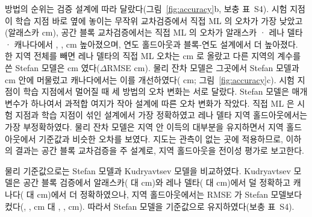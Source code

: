 방법의 순위는 검증 설계에 따라 달랐다(그림~\ref{fig:accuracy}b, 보충 표~S4). 시험 지점이 학습 지점 바로 옆에 놓이는 무작위 교차검증에서 직접 ML 의 오차가 가장 낮았고(알래스카 \nrmseAkrandDz{} cm), 공간 블록 교차검증에서는 직접 ML 의 오차가 알래스카 · 레나 델타 · 캐나다에서 \noptimAkDz, \noptimLeDz, \noptimCaDz{} cm 높아졌으며, 연도 홀드아웃과 블록-연도 설계에서 더 높아졌다. 한 지역 전체를 빼면 레나 델타의 직접 ML 오차는 \nrmseLeregDz{} cm 로 올랐고 다른 지역의 계수를 쓴 Stefan 모델은 \nrmseLeregPz{} cm 였다($\Delta$RMSE \ndrefLeregDz{} cm). 물리 잔차 모델은 그곳에서 Stefan 모델과 \ndrefLeregRoabs{} cm 안에 머물렀고 캐나다에서는 이를 개선하였다(\ndrefCaregRo{} cm; 그림~\ref{fig:accuracy}c). 시험 지점이 학습 지점에서 멀어질 때 세 방법의 오차 변화는 서로 달랐다. Stefan 모델은 매개변수가 하나여서 과적합 여지가 작아 설계에 따른 오차 변화가 작았다. 직접 ML 은 시험 지점과 학습 지점이 섞인 설계에서 가장 정확하였고 레나 델타 지역 홀드아웃에서는 가장 부정확하였다. 물리 잔차 모델은 지역 안 이득의 대부분을 유지하면서 지역 홀드아웃에서 기준값과 비슷한 오차를 보였다. 지도는 관측이 없는 곳에 적용하므로, 이하의 결과는 공간 블록 교차검증을 주 설계로, 지역 홀드아웃을 전이성 평가로 보고한다.

물리 기준값으로는 Stefan 모델과 Kudryavtsev 모델을 비교하였다. Kudryavtsev 모델은 공간 블록 검증에서 알래스카(\nkuAkblk{} 대 \nrmseAkblkPo{} cm)와 레나 델타(\nkuLeblk{} 대 \nrmseLeblkPo{} cm)에서 덜 정확하고 캐나다(\nkuCablk{} 대 \nrmseCablkPo{} cm)에서 더 정확하였으나, 지역 홀드아웃에서는 RMSE 가 Stefan 모델보다 컸다(\nrmseAkregKu, \nrmseLeregKu, \nrmseCaregKu{} cm 대 \nrmseAkregPz, \nrmseLeregPz, \nrmseCaregPz{} cm). 따라서 Stefan 모델을 기준값으로 유지하였다(보충 표~S4).

